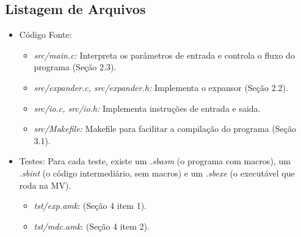 \documentclass[12pt, a4paper]{article}
\begin{document}
\subsection{Listagem de Arquivos}
\begin{itemize}
	\item Código Fonte:
	\begin{itemize}
		\item \emph{src/main.c:} Interpreta os parâmetros de entrada e controla o fluxo do programa (Seção 2.3).
		\item \emph{src/expander.c, src/expander.h:} Implementa o expansor (Seção 2.2).
		\item \emph{src/io.c, src/io.h:} Implementa instruções de entrada e saida.
		\item \emph{src/Makefile:} Makefile para facilitar a compilação do programa (Seção 3.1).
	\end{itemize}
	\item Testes:
	Para cada teste, existe um \emph{.sbasm} (o programa com macros), um \emph{.sbint} (o código intermediário, sem macros) e um \emph{.sbexe} (o executável que roda na MV).
	\begin{itemize}
		\item \emph{tst/exp.amk}: (Seção 4 item 1).
		\item \emph{tst/mdc.amk}: (Seção 4 item 2).
	\end{itemize}
	
\end{itemize}
\end{document}

